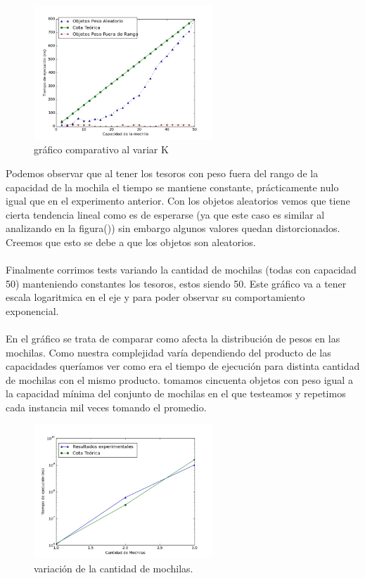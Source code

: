 \documentclass[spanish,12pt]{article}
\begin{document}
{\begin{figure}[H]
\centering
\includegraphics[width=0.6\textwidth]{ObjMejorCasoPesovsPesoDistSL}
\caption{gráfico comparativo al variar K}
\end{figure}

Podemos observar que al tener los tesoros con peso fuera del rango de la capacidad de la mochila el tiempo se mantiene constante, prácticamente nulo igual que en el experimento anterior. Con los objetos aleatorios vemos que tiene cierta tendencia lineal como es de esperarse (ya que este caso es similar al analizando en la figura()) sin embargo algunos valores quedan distorcionados. Creemos que esto se debe a que los objetos son aleatorios.
\\
\\
Finalmente corrimos tests variando la cantidad de mochilas (todas con capacidad 50) manteniendo constantes los tesoros, estos siendo 50. Este gráfico va a tener escala logaritmica en el eje y para poder observar su comportamiento exponencial.
\\
\\
En el  gráfico se trata de comparar como afecta la distribución de pesos en las mochilas. Como nuestra complejidad varía dependiendo del producto de las capacidades queríamos ver como era el tiempo de ejecución para distinta cantidad de mochilas con el mismo producto. tomamos cincuenta objetos con peso igual a la capacidad mínima del conjunto de mochilas en el que testeamos y repetimos cada instancia mil veces tomando el promedio.
\begin{figure}[H]
\centering
\includegraphics[width=0.6\textwidth]{VariaMoch}
\caption{variación de la cantidad de mochilas.}
\end{figure}

}
\end{document}
